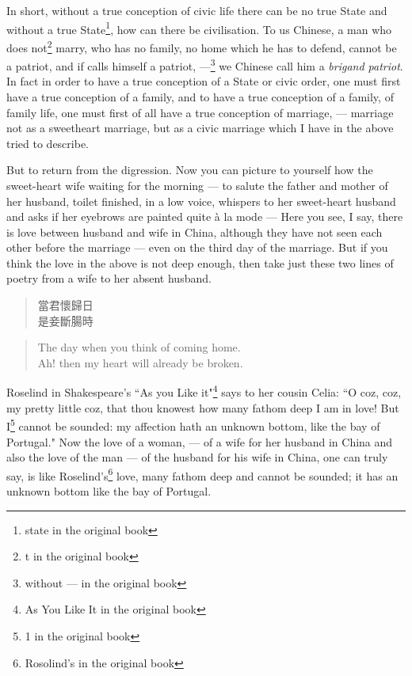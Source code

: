 In short, without a true conception of civic life there can be no true State and without a true State\footnote{state in the original book}, how can there be civilisation.
To us Chinese, a man who does not\footnote{t in the original book} marry, who has no family, no home which he has to defend, cannot be a patriot, and if calls himself a patriot, ---\footnote{without --- in the original book} we Chinese call him a \emph{brigand patriot}.
In fact in order to have a true conception of a State or civic order, one must first have a true conception of a family, and to have a true conception of a family, of family life, one must first of all have a true conception of marriage, --- marriage not as a sweetheart marriage, but as a civic marriage which I have in the above tried to describe.

But to return from the digression.
Now you can picture to yourself how the sweet-heart wife waiting for the morning --- to salute the father and mother of her husband, toilet finished, in a low voice, whispers to her sweet-heart husband and asks if her eyebrows are painted quite \`a la mode
--- Here you see, I say, there is love between husband and wife in China, although they have not seen each other before the marriage --- even on the third day of the marriage.
But if you think the love in the above is not deep enough, then take just these two lines of poetry from a wife to her absent husband.
\begin{quote}\footnotesize
   當君懷歸日\\
   是妾斷腸時\\
\end{quote}
\begin{quote}\footnotesize
   The day when you think of coming home.\\
   Ah! then my heart will already be broken.\\
\end{quote}

Roselind in Shakespeare's ``As you Like it"\footnote{As You Like It in the original book}  says to her cousin Celia: ``O coz, coz, my pretty little coz, that thou knowest how many fathom deep I am in love!
But I\footnote{1 in the original book} cannot be sounded: my affection hath an unknown bottom, like the bay of Portugal."
Now the love of a woman, --- of a wife for her husband in China and also the love of the man --- of the husband for his wife in China, one can truly say, is like Roselind's\footnote{Rosolind's in the original book} love, many fathom deep and cannot be sounded; it has an unknown bottom like the bay of Portugal.

